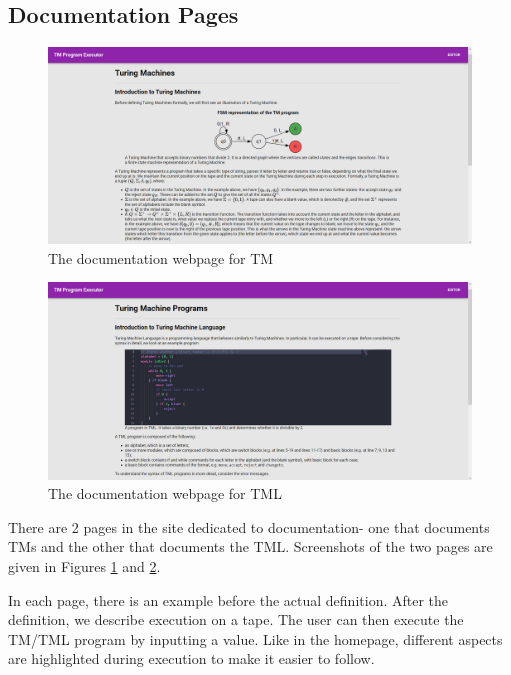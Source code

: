 \begin{appendices}
\section{Documentation Pages}
\begin{figure}[htb]
    \centering
    \includegraphics[scale=0.18]{images/Documentation for TM.png}
    \caption{The documentation webpage for TM}
    \label{fig:documentation_tm}
\end{figure}

\begin{figure}[htb]
    \centering
    \includegraphics[scale=0.18]{images/Documentation for TML.png}
    \caption{The documentation webpage for TML}
    \label{fig:documentation_tml}
\end{figure}

There are 2 pages in the site dedicated to documentation- one that documents TMs and the other that documents the TML. Screenshots of the two pages are given in Figures \ref{fig:documentation_tm} and \ref{fig:documentation_tml}. 

In each page, there is an example before the actual definition. After the definition, we describe execution on a tape. The user can then execute the TM/TML program by inputting a value. Like in the homepage, different aspects are highlighted during execution to make it easier to follow.


\end{appendices}
